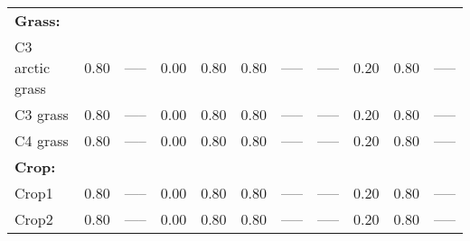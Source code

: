 \begin{landscape}
\begin{table}[htbp]
\begin{tabular}{lcccccccccc}
\multicolumn{11}{l}{\textbf{Grass:}}                                                                                       \\
C3  arctic grass & 0.80   & -----  & 0.00   & 0.80 & 0.80  & -----       & -----     & 0.20  & 0.80 & -----       \\
C3  grass        & 0.80   & -----  & 0.00   & 0.80 & 0.80  & -----       & -----     & 0.20  & 0.80 & -----       \\
C4  grass        & 0.80   & -----  & 0.00   & 0.80 & 0.80  & -----       & -----     & 0.20  & 0.80 & -----       \\\hline
\multicolumn{11}{l}{\textbf{Crop:}}                                                                                        \\
Crop1            & 0.80   & -----  & 0.00   & 0.80 & 0.80  & -----       & -----     & 0.20  & 0.80 & -----       \\
Crop2            & 0.80   & -----  & 0.00   & 0.80 & 0.80  & -----       & -----     & 0.20  & 0.80 & -----       \\ \bottomrule
\end{tabular}
\end{table}
\end{landscape}